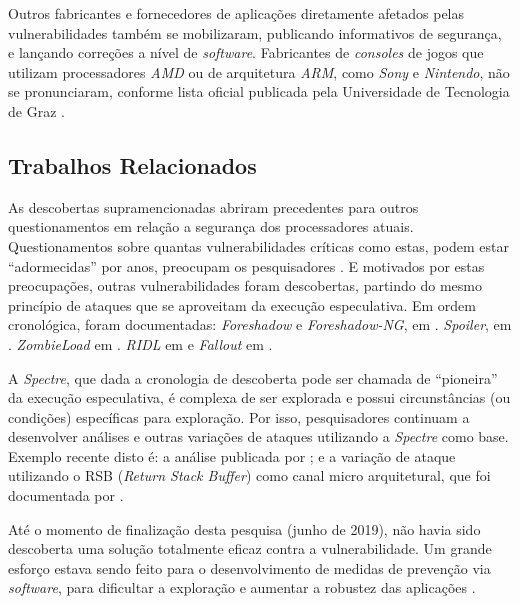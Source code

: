 \documentclass[
	article,			    %
	12pt,				    %
	oneside,			    %
	a4paper,			    %
	chapter=TITLE,		    %
	section=TITLE,		    %
	subsection=TITLE,	    %
	english,			    %
	brazil,				    %
	sumario=tradicional
]{abntex2}
\begin{document}
Outros fabricantes e fornecedores de aplicações diretamente afetados pelas vulnerabilidades também se mobilizaram, publicando informativos de segurança, e lançando correções a nível de \emph{software}. Fabricantes de \emph{consoles} de jogos que utilizam processadores \emph{AMD} ou de arquitetura \emph{ARM}, como \emph{Sony} e \emph{Nintendo}, não se pronunciaram, conforme lista oficial publicada pela Universidade de Tecnologia de Graz \cite{Graz2018Meltdown}.

\subsection{Trabalhos Relacionados}
As descobertas supramencionadas abriram precedentes para outros questionamentos em relação a segurança dos processadores atuais. Questionamentos sobre quantas vulnerabilidades críticas como estas, podem estar ``adormecidas'' por anos, preocupam os pesquisadores \cite{Andy2018Triple}. E motivados por estas preocupações, outras vulnerabilidades foram descobertas, partindo do mesmo princípio de ataques que se aproveitam da execução especulativa. Em ordem cronológica, foram documentadas: \emph{Foreshadow} e \emph{Foreshadow-NG}, em . \emph{Spoiler}, em . \emph{ZombieLoad} em . \emph{RIDL} em  e \emph{Fallout} em .

A \emph{Spectre}, que dada a cronologia de descoberta pode ser chamada de ``pioneira'' da execução especulativa, é complexa de ser explorada e possui circunstâncias (ou condições) específicas para exploração. Por isso, pesquisadores continuam a desenvolver análises e outras variações de ataques utilizando a \emph{Spectre} como base. Exemplo recente disto é: a análise publicada por ; e a variação de ataque utilizando o RSB (\emph{Return Stack Buffer}) como canal micro arquitetural, que foi documentada por .

Até o momento de finalização desta pesquisa (junho de 2019), não havia sido descoberta uma solução totalmente eficaz contra a vulnerabilidade. Um grande esforço estava sendo feito para o desenvolvimento de medidas de prevenção via \emph{software}, para dificultar a exploração e aumentar a robustez das aplicações \cite{Graz2018Meltdown}.
\end{document}
